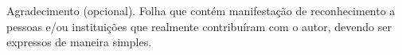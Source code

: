 \begin{agradecimentos}
	Agradecimento (opcional). Folha que contém manifestação de reconhecimento a pessoas e/ou instituições que realmente contribuíram com o autor, devendo ser expressos de maneira simples.	
\end{agradecimentos}